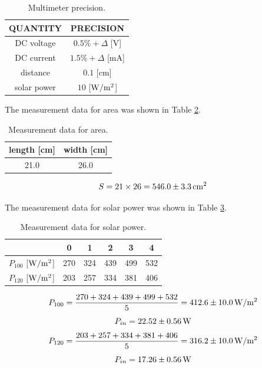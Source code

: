 \documentclass{article}
\begin{document}
{{\begin{table}[!h]
\begin{center}
\begin{tabular}{|c|c|}
\hline
QUANTITY & PRECISION \\
\hline
DC voltage & $0.5\%+\Delta$ [V]\\
\hline
DC current & $1.5\%+\Delta$ [mA]\\
\hline
distance & $0.1$ [cm]\\
\hline
solar power & $10$ [$\rm W/m^2$]\\
\hline
\end{tabular}
\caption{Multimeter precision.}
\label{tab-1}
\end{center}
\end{table}

The measurement data for area was shown in Table \ref{tab-2}.

\begin{table}[!h]
\begin{center}
\begin{tabular}{|c|c|}
\hline
length [cm] & width [cm] \\
\hline
21.0 & 26.0 \\
\hline
\end{tabular}
\caption{Measurement data for area.}
\label{tab-2}
\end{center}
\end{table}

$$S=21\times26=546.0\pm3.3\,\rm cm^2$$

The measurement data for solar power was shown in Table \ref{tab-3}.

\begin{table}[!h]
\begin{center}
\begin{tabular}{|c|c|c|c|c|c|}
\hline
& 0 & 1 & 2 & 3 & 4 \\
\hline
$P_{100}$ [$\rm W/m^2$] & 270 & 324 & 439 & 499 & 532 \\
\hline
$P_{120}$ [$\rm W/m^2$] & 203 & 257 & 334 & 381 & 406 \\
\hline
\end{tabular}
\caption{Measurement data for solar power.}
\label{tab-3}
\end{center}
\end{table}

$$P_{100}=\frac{270+324+439+499+532}{5}=412.6\pm10.0 \,\rm W/m^2$$
$$P_{in}=22.52\pm0.56\,\rm W$$
$$P_{120}=\frac{203+257+334+381+406}{5}=316.2\pm10.0 \,\rm W/m^2$$
$$P_{in}=17.26\pm0.56\,\rm W$$


}}
\end{document}
